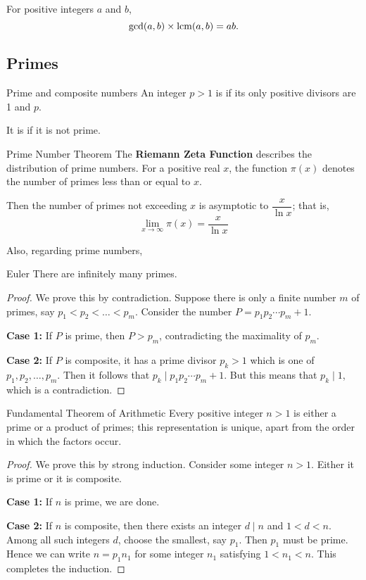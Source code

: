 \begin{thrm}{}{}
For positive integers $a$ and $b$,
\[ \gcd(a,b) \times \operatorname{lcm}(a,b) = ab. \]
\end{thrm}

\subsection{Primes}
\begin{defn}{Prime and composite numbers}{}
An integer $p > 1$ is  if its only positive divisors are 1 and $p$. 

It is  if it is not prime.
\end{defn}

\begin{thrm}{Prime Number Theorem}{}
The \textbf{Riemann Zeta Function} describes the distribution of prime numbers. For a positive real $x$, the function $\pi(x)$ denotes the number of primes less than or equal to $x$.

Then the number of primes not exceeding $x$ is asymptotic to $\dfrac{x}{\ln x}$; that is,
\[ \lim_{x\to\infty}\pi(x)=\frac{x}{\ln x} \]
\end{thrm}

Also, regarding prime numbers,
\begin{thrm}{Euler}{}
There are infinitely many primes.
\end{thrm}

\begin{proof}
We prove this by contradiction. Suppose there is only a finite number $m$ of primes, say $p_1 < p_2 < \dots < p_m$. Consider the number $P = p_1 p_2\cdots p_m +1$. 

\textbf{Case 1:} If $P$ is prime, then $P > p_m$, contradicting the maximality of $p_m$. 

\textbf{Case 2:} If $P$ is composite, it has a prime divisor $p_k>1$ which is one of $p_1,p_2,\dots,p_m$. Then it follows that $p_k \mid p_1 p_2\cdots p_m +1$. But this means that $p_k\mid 1$, which is a contradiction.
\end{proof}

\begin{thrm}{Fundamental Theorem of Arithmetic}{}
Every positive integer $n>1$ is either a prime or a product of primes; this representation is unique, apart from the order in which the factors occur.
\end{thrm}

\begin{proof}
We prove this by strong induction. Consider some integer $n > 1$. Either it is prime or it is composite. 

\textbf{Case 1:} If $n$ is prime, we are done. 

\textbf{Case 2:} If $n$ is composite, then there exists an integer $d \mid n$ and $1 < d < n$. Among all such integers $d$, choose the smallest, say $p_1$. Then $p_1$ must be prime. Hence we can write $n = p_1 n_1$ for some integer $n_1$ satisfying $1 < n_1 < n$. This completes the induction.
\end{proof}
\pagebreak

